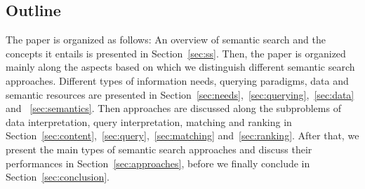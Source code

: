 \subsection{Outline}
The paper is organized as follows: An overview of semantic search and the concepts it entails is presented in Section~\ref{sec:ss}. Then, the paper is organized mainly along the aspects based on which we distinguish different semantic search approaches. Different types of information needs, querying paradigms, data and semantic resources are presented in Section~\ref{sec:needs},~\ref{sec:querying},~\ref{sec:data} and ~\ref{sec:semantics}. Then approaches are discussed along the subproblems of data interpretation, query interpretation, matching and ranking in Section~\ref{sec:content},~\ref{sec:query},~\ref{sec:matching} and~\ref{sec:ranking}. After that, we present the main types of semantic search approaches and discuss their performances in Section~\ref{sec:approaches}, 
before we finally conclude in Section~\ref{sec:conclusion}.